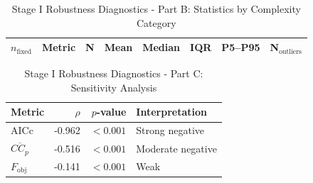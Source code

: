 \documentclass{article}
\begin{document}
\begin{table}[h!]
\centering
\caption{Stage I Robustness Diagnostics - Part B: Statistics by Complexity Category}
\label{tab:S1B}
\small
\begin{tabular}{rlrrrrrr}
\toprule
$n_{\mathrm{fixed}}$ & Metric & N & Mean & Median & IQR & P5--P95 & N$_{\mathrm{outliers}}$ \\
\midrule
\bottomrule
\end{tabular}
\end{table}

\begin{table}[h!]
\centering
\caption{Stage I Robustness Diagnostics - Part C: Sensitivity Analysis}
\label{tab:S1C}
\begin{tabular}{lrrl}
\toprule
Metric & $\rho$ & $p$-value & Interpretation \\
\midrule
AICc & -0.962 & $<0.001$ & Strong negative \\
$\overline{CC_p}$ & -0.516 & $<0.001$ & Moderate negative \\
$F_{\mathrm{obj}}$ & -0.141 & $<0.001$ & Weak \\
\bottomrule
\end{tabular}
\end{table}










\end{document}
